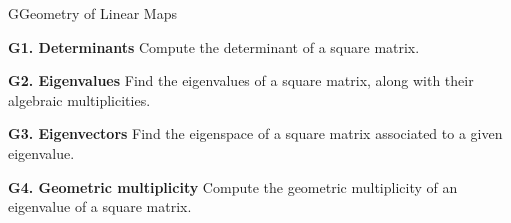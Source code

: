 
\begin{module}{G}{Geometry of Linear Maps}

\begin{moduleStandards}
  \item \textbf{G1. Determinants}
        Compute the determinant of a square matrix.
  \item \textbf{G2. Eigenvalues}
        Find the eigenvalues of a square matrix, along with their algebraic multiplicities.
  \item \textbf{G3. Eigenvectors}
        Find the eigenspace of a square matrix associated to a given eigenvalue.
   \item \textbf{G4. Geometric multiplicity}
        Compute the geometric multiplicity of an eigenvalue of a square matrix.
\end{moduleStandards}








\end{module}

